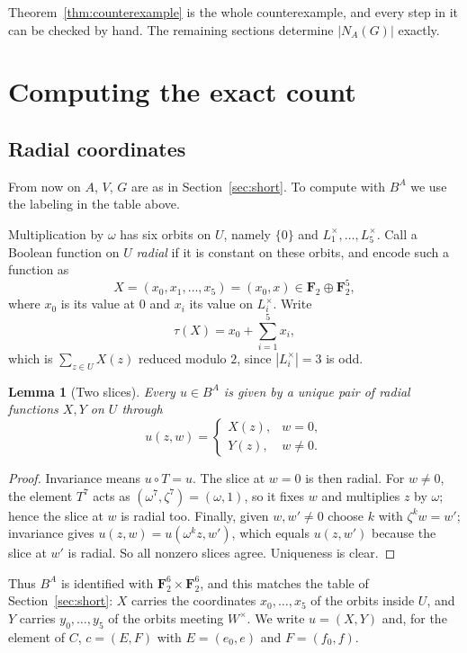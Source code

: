 \documentclass[11pt,a4paper,reqno]{amsart}
\newtheorem{lemma}[theorem]{Lemma}
\theoremstyle{definition}
\theoremstyle{remark}
\newcommand{\F}{\mathbf F}
\begin{document}
Theorem~\ref{thm:counterexample} is the whole counterexample, and every
step in it can be checked by hand.  The remaining sections determine
$|N_A(G)|$ exactly.

\section{Computing the exact count}\label{sec:radial}

\subsection*{Radial coordinates}

From now on $A$, $V$, $G$ are as in Section~\ref{sec:short}.  To compute
with $B^A$ we use the labeling in the table above.

Multiplication by $\omega$ has six orbits on $U$, namely $\{0\}$ and
$L_1^\times,\dots,L_5^\times$.  Call a Boolean function on $U$
\emph{radial} if it is constant on these orbits, and encode such a
function as
\[
 X=(x_0,x_1,\dots,x_5)=(x_0,x)\in\F_2\oplus\F_2^5 ,
\]
where $x_0$ is its value at $0$ and $x_i$ its value on $L_i^\times$.
Write
\[
 \tau(X)=x_0+\sum_{i=1}^5x_i ,
\]
which is $\sum_{z\in U}X(z)$ reduced modulo $2$, since $|L_i^\times|=3$
is odd.

\begin{lemma}[Two slices]\label{lem:two-slice}
Every $u\in B^A$ is given by a unique pair of radial functions $X,Y$ on
$U$ through
\[
 u(z,w)=
 \begin{cases}
 X(z),&w=0,\\
 Y(z),&w\neq0 .
 \end{cases}
\]
\end{lemma}

\begin{proof}
Invariance means $u\circ T=u$.  The slice at $w=0$ is then radial.  For
$w\neq0$, the element $T^7$ acts as $(\omega^7,\zeta^7)=(\omega,1)$,
so it fixes $w$ and multiplies $z$ by $\omega$; hence the slice at $w$
is radial too.  Finally, given $w,w'\neq0$ choose $k$ with
$\zeta^kw=w'$; invariance gives $u(z,w)=u(\omega^kz,w')$, which equals
$u(z,w')$ because the slice at $w'$ is radial.  So all nonzero slices
agree.  Uniqueness is clear.
\end{proof}

Thus $B^A$ is identified with $\F_2^6\times\F_2^6$, and this matches
the table of Section~\ref{sec:short}: $X$ carries the coordinates
$x_0,\dots,x_5$ of the orbits inside $U$, and $Y$ carries
$y_0,\dots,y_5$ of the orbits meeting $W^\times$.  We write
$u=(X,Y)$ and, for the element of $C$, $c=(E,F)$ with
$E=(e_0,e)$ and $F=(f_0,f)$.
\end{document}
